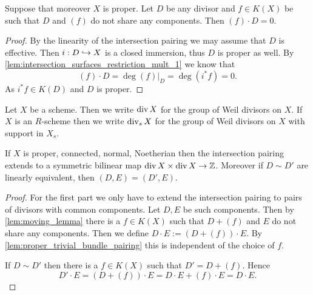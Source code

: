 \begin{lemma}\label{lem:proper_trivial_bundle_pairing}
	Suppose that moreover $X$ is proper. 
	Let  $D$ be any divisor and $f \in K(X)$ be such that $D$ and $(f)$ do not share any components. 
	Then $(f)\cdot D = 0$. 
\end{lemma}
\begin{proof}
	By the linearity of the intersection pairing we may assume that $D$ is effective. 
	Then $ i: D \hookrightarrow X$ is a closed immersion, thus $D$ is proper as well. By \cref{lem:intersection_surfaces_restriction_mult_1} we know that \[
		(f)\cdot D = \deg (f)|_D = \deg (i^* f) = 0
	.\] 
	As $i^* f \in K(D)$ and $D$ is proper. 
\end{proof}
\begin{definition}
	Let $X$ be a scheme. Then we write $\operatorname{div} X$ for the group of Weil divisors on $X$.
	If  $X$ is an $R$-scheme then we write $\operatorname{div}_s X$ for the group of Weil divisors on $X$ with support in $X_s$. 
\end{definition}

\begin{proposition}\label{prop:intersection_pairing_proper_model}
	If $X$ is proper, connected, normal, Noetherian then the intersection pairing extends to a symmetric bilinear map $\operatorname{div} X \times  \operatorname{div} X \to \mathbb{Z}$. 
	Moreover if $D\sim D'$ are linearly equivalent, then $(D, E) = (D', E)$.
\end{proposition}
\begin{proof}
	For the first part we only have to extend the intersection pairing to pairs of divisors with common components. 
	Let $D, E$ be such components. 
	Then by \cref{lem:moving_lemma} there is a $f \in K(X)$ such that $D + (f)$ and $E$ do not share any components. 
	Then we define $D\cdot E := (D + (f))\cdot E$. 
	By \cref{lem:proper_trivial_bundle_pairing} this is independent of the choice of $f$. 

	If $D \sim D'$ then there is a $f \in K(X)$ such that $D' = D + (f)$. 
	Hence \[
		D'\cdot E = (D + (f))\cdot E = D\cdot E + (f)\cdot E = D\cdot E
	.\] 
\end{proof}



